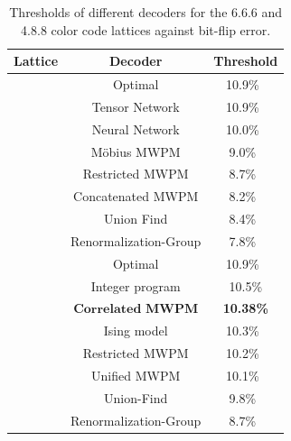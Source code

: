 \documentclass[%
 reprint,
 amsmath,amssymb,
 aps,
]{revtex4-2}
\begin{document}
\begin{table}[h]
    \centering
    \begin{tabular}{|c|c|c|}
    \hline
    Lattice & Decoder & Threshold \\
    \hline
     & Optimal & 10.9\%~\cite{katzgraber2009error} \\
           & Tensor Network & 10.9\%~\cite{chubb2021general} \\
           & Neural Network & 10.0\%~\cite{maskara2019advantages} \\
           & M{\"o}bius MWPM & 9.0\%~\cite{sahay2022decoder} \\
           & Restricted MWPM & 8.7\%~\cite{delfosse2014decoding_cc} \\
           & Concatenated MWPM & 8.2\%~\cite{lee2025color} \\
           & Union Find & 8.4\%~\cite{delfosse2021almost} \\
           & Renormalization-Group & 7.8\%~\cite{sarvepalli2012efficient} \\

    \hline
     & Optimal & 10.9\%~\cite{katzgraber2009error} \\
        & Integer program & 10.5\%\cite{landahl2011fault} \\
        & $\textbf{Correlated MWPM}$ & \textbf{10.38\%} \\
        & Ising model & 10.3\%~\cite{takada2024ising} \\
        & Restricted MWPM & 10.2\%~\cite{kubica2023efficient} \\
        & Unified MWPM & 10.1\%~\cite{benhemou2025minimising} \\
        & Union-Find & 9.8\%~\cite{kubica2023efficient} \\
        & Renormalization-Group & 8.7\%~\cite{bombin2012universal} \\
        
    \hline
    \end{tabular}
    \caption{Thresholds of different decoders for the 6.6.6 and 4.8.8 color code lattices against bit-flip error.}
    \label{tab:thresholds}
\end{table}
\end{document}
